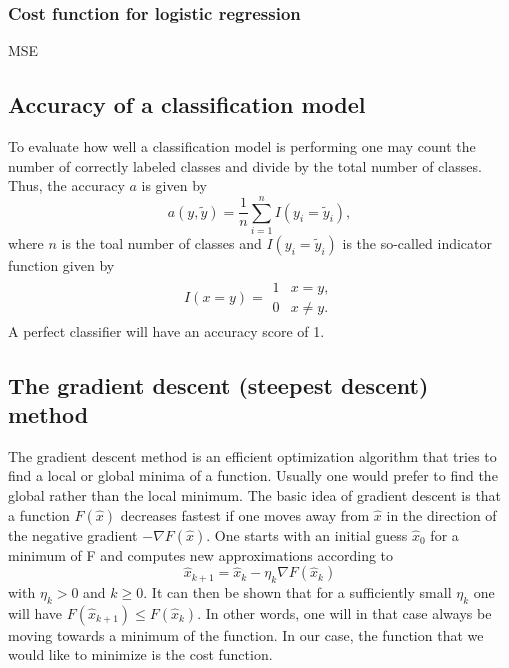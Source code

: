 \documentclass[a4paper,12pt]{article}
\begin{document}
\subsubsection{Cost function for logistic regression}
MSE

\subsection{Accuracy of a classification model}
To evaluate how well a classification model is performing one may count the number of correctly labeled classes and divide by the total number of classes. Thus, the accuracy $a$ is given by
\begin{equation}
    a(y,\tilde{y}) = \frac{1}{n}\sum_{i=1}^n I(y_i = \tilde{y}_i),
\end{equation}
where $n$ is the toal number of classes and $I(y_i = \tilde{y}_i)$ is the so-called indicator function given by
\begin{align}
    I(x = y) = \begin{array}{cc}
    1 & x = y, \\
    0 & x \neq y.
    \end{array}
\end{align}
A perfect classifier will have an accuracy score of 1.

\subsection{The gradient descent (steepest descent) method}
The gradient descent method is an efficient optimization algorithm that tries to find a local or global minima of a function. Usually one would prefer to find the global rather than the local minimum. The basic idea of gradient descent is that a function $F(\hat{x})$ decreases fastest if one moves away from $\hat{x}$ in the direction of the negative gradient $-\nabla F(\hat{x})$.\newline
One starts with an initial guess $\hat{x}_0$ for a minimum of F and computes new approximations according to
\begin{equation}
    \hat{x}_{k+1} = \hat{x}_k - \eta_k \nabla F(\hat{x}_k)
\end{equation}
with $\eta_k > 0$ and $k \geq 0$. It can then be shown that for a sufficiently small $\eta_k$ one will have $F(\hat{x}_{k+1}) \leq F(\hat{x}_k)$. In other words, one will in that case always be moving towards a minimum of the function.\newline
In our case, the function that we would like to minimize is the cost function.\newline
\end{document}
